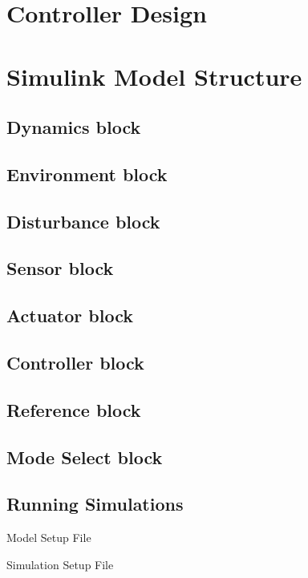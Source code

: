\section{Controller Design}

\section{Simulink Model Structure}
\subsection{Dynamics block}
\subsection{Environment block}
\subsection{Disturbance block}
\subsection{Sensor block}
\subsection{Actuator block}
\subsection{Controller block}
\subsection{Reference block}
\subsection{Mode Select block}
\subsection{Running Simulations}
Model Setup File

Simulation Setup File
